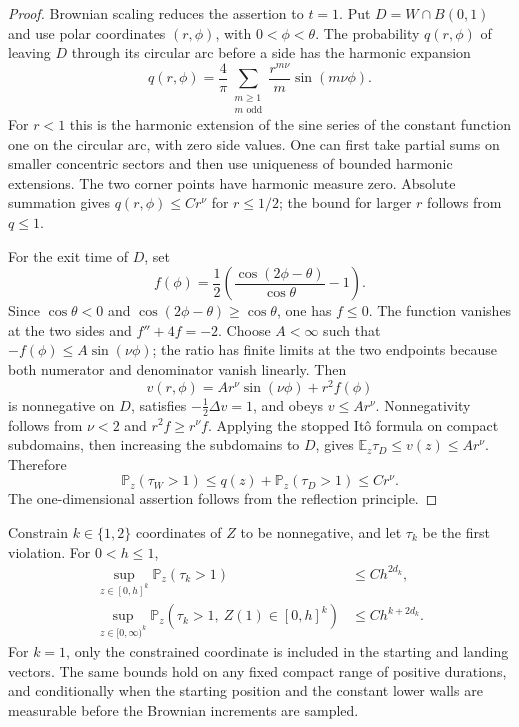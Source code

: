 \begin{proof}
Brownian scaling reduces the assertion to $t=1$.  Put
$D=W\cap B(0,1)$ and use polar coordinates $(r,\phi)$, with
$0<\phi<\theta$.  The probability $q(r,\phi)$ of leaving $D$ through
its circular arc before a side has the harmonic expansion
\[
 q(r,\phi)=\frac4\pi
 \sum_{\substack{m\ge1\\m\text{ odd}}}
       \frac{r^{m\nu}}{m}\sin(m\nu\phi).
\]
For $r<1$ this is the harmonic extension of the sine series of the
constant function one on the circular arc, with zero side values.
One can first take partial sums on smaller concentric sectors and
then use uniqueness of bounded harmonic extensions.  The two corner
points have harmonic measure zero.  Absolute summation gives
$q(r,\phi)\le C r^\nu$ for $r\le1/2$; the bound for larger $r$ follows
from $q\le1$.

For the exit time of $D$, set
\[
 f(\phi)=\frac12\left(\frac{\cos(2\phi-\theta)}{\cos\theta}-1\right).
\]
Since $\cos\theta<0$ and
$\cos(2\phi-\theta)\ge\cos\theta$, one has $f\le0$.  The function
vanishes at the two sides and $f''+4f=-2$.  Choose $A<\infty$ such
that $-f(\phi)\le A\sin(\nu\phi)$; the ratio has finite limits at the
two endpoints because both numerator and denominator vanish linearly.
Then
\[
 v(r,\phi)=A r^\nu\sin(\nu\phi)+r^2 f(\phi)
\]
is nonnegative on $D$, satisfies $-\tfrac12\Delta v=1$, and obeys
$v\le A r^\nu$.  Nonnegativity follows from $\nu<2$ and
$r^2 f\ge r^\nu f$.  Applying the stopped It\^o formula on compact
subdomains, then increasing the subdomains to $D$, gives
$\mathbb E_z\tau_D\le v(z)\le A r^\nu$.
Therefore
\[
 \mathbb P_z(\tau_W>1)
 \le q(z)+\mathbb P_z(\tau_D>1)
 \le C r^\nu.
\]
The one-dimensional assertion follows from the reflection principle.
\end{proof}

\begin{lemma}\label{arm:killed-landing}
Constrain $k\in\{1,2\}$ coordinates of $Z$ to be nonnegative, and let
$\tau_k$ be the first violation.  For $0<h\le1$,
\begin{align}
 \sup_{z\in[0,h]^k}\mathbb P_z(\tau_k>1)
     &\le C h^{2d_k},\label{arm:survival-small}\\
 \sup_{z\in[0,\infty)^k}
 \mathbb P_z(\tau_k>1,\ Z(1)\in[0,h]^k)
     &\le C h^{k+2d_k}.\label{arm:landing-small}
\end{align}
For $k=1$, only the constrained coordinate is included in the starting
and landing vectors.  The same bounds hold on any fixed compact range
of positive durations, and conditionally when the starting position and
the constant lower walls are measurable before the Brownian increments
are sampled.
\end{lemma}

